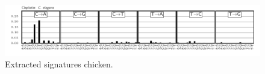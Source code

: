 \begin{figure}
\centering
\includegraphics[scale=1.0]{figures/extracted_signatures_worm.pdf}
\caption{Extracted signatures chicken. }
\label{sfig:supp_extracted_signatures_worm}
\end{figure}

\FloatBarrier
